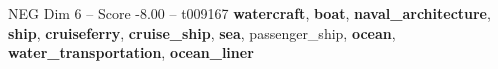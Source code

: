 \begin{textsample}{NEG Dim 6 – Score -8.00 – t009167}  \label{ex:f6_neg_028}
\textbf{watercraft}, \textbf{boat}, \textbf{naval\_architecture}, \textbf{ship}, \textbf{cruiseferry}, \textbf{cruise\_ship}, \textbf{sea}, passenger\_ship, \textbf{ocean}, \textbf{water\_transportation}, \textbf{ocean\_liner}

\end{textsample}
